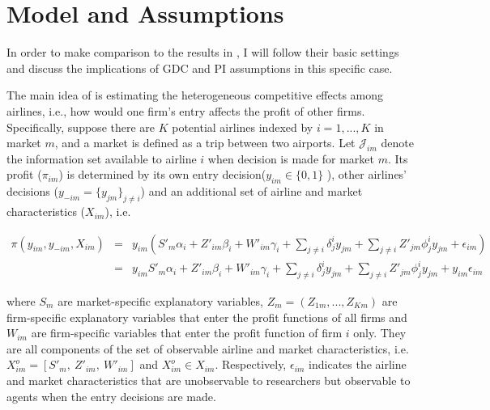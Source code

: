 \documentclass[a4paper]{article}
\begin{document}
\bigskip


\section{Model and Assumptions}

In order to make comparison to the results in \cite{ciliberto2009market}, I will follow their basic settings and discuss the implications of GDC and PI assumptions in this specific 
case.

The main idea of \cite{ciliberto2009market} is estimating the heterogeneous competitive effects among airlines, i.e., how would one firm's entry affects the profit of other firms. Specifically, suppose there are $K$ potential airlines indexed by $i=1,...,K$ in market $m$, and a market is defined as a trip between two airports. Let $\mathcal{J}_{im}$ denote the information set available to airline $i$ when decision is made for market $m$. Its profit ($\pi_{im}$) is determined by its own entry decision($y_{im} \in \{0,1\}$ ), other airlines' decisions ($y_{-im}=\{y_{jm}\}_{j \neq i}$) and an additional set of airline and market characteristics ($X_{im}$), i.e. 



\begin{eqnarray}
\pi(y_{im},y_{-im},X_{im})&=& y_{im}(S'_m\alpha_i+Z'_{im}\beta_i+W'_{im}\gamma_i+\sum_{j\neq i}\delta_{j}^i y_{jm}+\sum_{j\neq i}Z'_{jm}\phi_j^iy_{jm}+\epsilon_{im}) \nonumber \\
&=& y_{im}S'_m\alpha_i+Z'_{im}\beta_i+W'_{im}\gamma_i+\sum_{j\neq i}\delta_{j}^i y_{jm}+\sum_{j\neq i}Z'_{jm}\phi_j^iy_{jm} + y_{im} \epsilon_{im}
\label{profit}
\end{eqnarray}

 where $S_m$ are market-specific explanatory variables, $Z_{m}=(Z_{1m},...,Z_{Km})$ are firm-specific explanatory variables that enter the profit functions of all firms and $W_{im}$ are firm-specific variables that enter the profit function of firm $i$ only. They are all components of the set of observable airline and market characteristics, i.e.
$X^o_{im}=[S'_m, \ Z'_{im}, \ W'_{im}]$ and $X^o_{im} \in X_{im}$. Respectively, $\epsilon_{im}$ indicates the airline and market characteristics that are unobservable to researchers but observable to agents when the entry decisions are made. 


 
\end{document}
